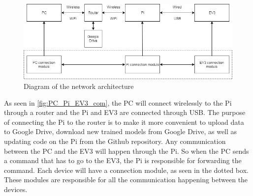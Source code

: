 \begin{figure} [H]
    \centering
    \includegraphics[width=\textwidth]{images/design/Pc_Pi_EV3_Connection.jpg}
    \caption{Diagram of the network architecture}
    \label{fig:PC_Pi_EV3_com}
\end{figure}

As seen in \autoref{fig:PC_Pi_EV3_com}, the PC will connect wirelessly to the Pi through a router and the Pi and EV3 are connected through USB. 
The purpose of connecting the Pi to the router is to make it more convenient to upload data to Google Drive, download new trained models from Google Drive, as well as updating code on the Pi from the Github repository. 
Any communication between the PC and the EV3 will happen through the Pi. 
So when the PC sends a command that has to go to the EV3, the Pi is responsible for forwarding the command. 
Each device will have a connection module, as seen in the dotted box. 
These modules are responsible for all the communication happening between the devices.
